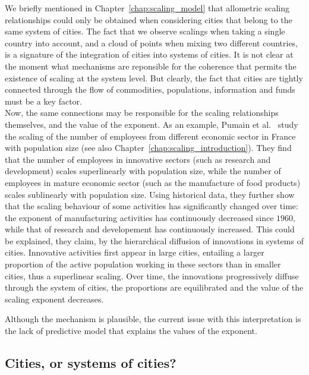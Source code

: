 We briefly mentioned in Chapter~\ref{chap:scaling_model} that allometric scaling relationships
could only be obtained when considering cities that belong to the same system of
cities. The fact that we observe scalings when taking a single country into
account, and a cloud of points when mixing two different countries, is a
signature of the integration of cities into systems of cities. It is
not clear at the moment what mechanisms are reponsible for the
coherence that permits the existence of scaling at the system level. But
clearly, the fact that cities are tightly connected through
the flow of commodities, populations, information and funds must be a key
factor.\\

Now, the same connections may be responsible for the scaling relationships
themselves, and the value of the exponent. As an example, Pumain et
al.~\cite{Pumain:2006} study the scaling of the number of employees from
different economic sector in France with population size (see also
Chapter~\ref{chap:scaling_introduction}). They find that the number of employees
in innovative sectors (such as research and development) scales superlinearly
with population size, while the number of employees in mature economic sector
(such as the manufacture of food products) scales sublinearly with population
size. Using historical data, they further show that the scaling behaviour of
some activities has significantly changed over time: the exponent of
manufacturing activities has continuously decreased since $1960$, while that of
research and developement has continuously increased. This could be explained,
they claim, by the hierarchical diffusion of innovations in systems of cities.
Innovative activities first appear in large cities, entailing a larger
proportion of the active population working in these sectors than in smaller
cities, thus a superlinear scaling.  Over time, the innovations progressively
diffuse through the system of cities, the proportions are equilibrated and the
value of the scaling exponent decreases.

Although the mechanism is plausible, the current issue with this interpretation
is the lack of predictive model that explains the values of the exponent. 


\subsection{Cities, or systems of cities?}
\label{sub:cities_or_systems_of_cities_}

